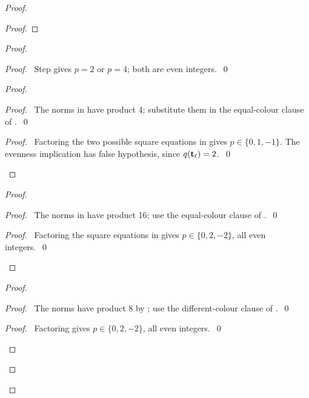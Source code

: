 \begin{mergedproofsection}
\begin{proof}
\begin{proof}
\end{proof}
\begin{proof}
 \begin{proof}\pf\ Step  gives $p=2$ or $p=4$;
 both are even integers.~\qed\end{proof}
 \begin{proof}
  \begin{proof}\pf\ The norms in  have product
  4; substitute them in the equal-colour clause of .~\qed\end{proof}
  \qedstep
  \begin{proof}\pf\ Factoring the two possible square equations in
   gives $p\in\{0,1,-1\}$.
  The evenness implication has false hypothesis, since $q({\mathbf t}_\ell)=2$.~\qed\end{proof}
 \end{proof}
 \begin{proof}
  \begin{proof}\pf\ The norms in  have product
  16; use the equal-colour clause of .~\qed\end{proof}
  \qedstep
  \begin{proof}\pf\ Factoring the square equations in
   gives $p\in\{0,2,-2\}$, all even integers.~\qed\end{proof}
 \end{proof}
 \begin{proof}
  \begin{proof}\pf\ The norms have product 8 by ;
  use the different-colour clause of .~\qed\end{proof}
  \qedstep
  \begin{proof}\pf\ Factoring  gives
  $p\in\{0,2,-2\}$, all even integers.~\qed\end{proof}
 \end{proof}

\end{proof}
\end{proof}
\end{mergedproofsection}
